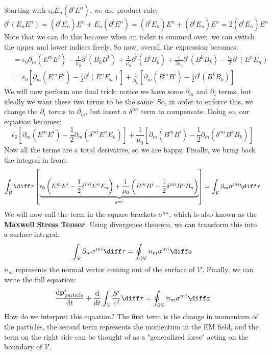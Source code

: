 Starting with \( \epsilon_0 E_n (\partial^{i}E^{n}) \), we use product rule:
\[
	\partial^{i}(E_n E^{n}) = (\partial^{i}E_n)E^{n} + E_n(\partial^{i} E^{n}) = (\partial^{i} E_n)E^{n} +
	(\partial^{i}E_n) E^{n} = 2(\partial^{i}E_n)E^{n}
\]
Note that we can do this because when an index is summed over, we can switch the upper and lower indices
freely. So now, overall the expression becomes:
\begin{align*}
	[\text{stuff}] &= \epsilon_0 \partial_m(E^{m}E^{i}) - \frac{1}{\mu_0}\partial^{i}(B_k B^{k}) +
	\frac{1}{\mu_0}\partial^{i}(B^{i}B_k) + \frac{1}{2\mu_0}\partial^{i}(B^{k}B_k) -
	\frac{\epsilon_0}{2}\partial^{i}(E^{n}E_n)\\
	&= \epsilon_0 \left[ \partial_m (E^{m}E^{i}) - \frac{1}{2}\partial^{i}(E^{n}E_n) \right] + \frac{1}{\mu_0}
	\left[ \partial_m (B^{m}B^{i}) - \frac{1}{2}\partial^{i}(B^{k}B_k) \right]
\end{align*}
We will now perform one final trick: notice we have some \( \partial_m \) and \( \partial_i \) terms, but
ideally we want these two terms to be the same. So, in order to enforce this, we change the \( \partial_i \)
terms to \( \partial_m \), but insert a \( \delta^{im} \) term to compensate. Doing so, our equation becomes:
\[
	\epsilon_0 \left[ \partial_m (E^{m}E^{i}) - \frac{1}{2}\partial_m(\delta^{mi} E^{n}E_n) \right] +
	\frac{1}{\mu_0}\left[ \partial_m(B^{m}B^{i}) - \frac{1}{2}\partial_m(\delta^{mi} B^{k}B_k) \right]
\]
Now all the terms are a total derivative, so we are happy. Finally, we bring back the integral in front:
\[
	\int_{\mathcal{V}}\diff \tau \left[ \underbrace{\epsilon_0 \left(E^{m}E^{i} -
		\frac{1}{2}\delta^{mi}E^{n}E_n\right) + \frac{1}{\mu_0}\left(B^{m}B^{i} -
	\frac{1}{2}\delta^{mi}B^{n}B_n\right)}_{\sigma^{mi}} \right] = \int_{\mathcal{V}} \partial_m \sigma^{mi} 
	\diff \tau 
\]
We will now call the term in the square brackets \( \sigma^{mi} \), which is also known as the
\textbf{Maxwell Stress Tensor}. Using divergence theorem, we can transform this into a surface integral:
\[
	\int_{\mathcal{V}}\partial_m \sigma^{mi} \diff \tau = 
	\oint_{\partial \mathcal{V}} n_m \sigma^{mi} \diff a 
\]
\( n_m \) represents the normal vector coming out of the surface of \( \mathcal{V} \). Finally, we can
write the full equation:
\begin{equation}
	\dv{\mathbf{p}_\text{particle}^{i}}{t} + \dv{t} \int_\mathcal{V} \frac{S^{i}}{c^2} \diff \tau =
	\oint_{\partial \mathcal{V}} n_m \sigma^{mi} \diff a 
	\label{cont-momentum}
\end{equation}
How do we interpret this equation? The first term is the change in momentum of the particles, the second term
represents the momentum in the EM field, and the term on the right side can be thought of as a "generalized
force" acting on the boundary of \( \mathcal{V} \). 

